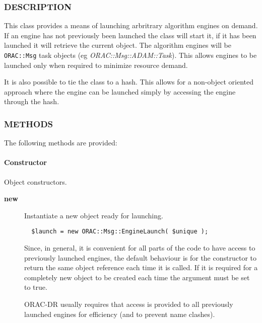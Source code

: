 \subsubsection*{DESCRIPTION\label{ORAC::Msg::EngineLaunch_DESCRIPTION}}


This class provides a means of launching arbritrary algorithm
engines on demand. If an engine has not previously been
launched the class will start it, if it has been launched it
will retrieve the current object. The algorithm engines will
be \texttt{ORAC::Msg} task objects (eg \emph{ORAC::Msg::ADAM::Task}).
This allows engines to be launched only when required to minimize
resource demand.



It is also possible to tie the class to a hash. This allows
for a non-object oriented approach where the engine can be launched
simply by accessing the engine through the hash.

\subsubsection*{METHODS\label{ORAC::Msg::EngineLaunch_METHODS}}


The following methods are provided:

\paragraph*{Constructor\label{ORAC::Msg::EngineLaunch_Constructor}}


Object constructors.

\begin{description}

\item[{\textbf{new}}] \mbox{}

Instantiate a new object ready for launching.

\begin{verbatim}
  $launch = new ORAC::Msg::EngineLaunch( $unique );
\end{verbatim}


Since, in general, it is convenient for all parts of the code
to have access to previously launched engines, the default
behaviour is for the constructor to return the same object reference
each time it is called. If it is required for a completely new object
to be created each time the argument must be set to true.



ORAC-DR usually requires that access is provided to all previously
launched engines for efficiency (and to prevent name clashes).

\end{description}
